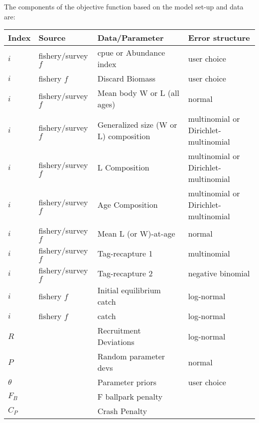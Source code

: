 The components of the objective function based on the model set-up and data are: 
\begin{longtable}{p{1cm} p{2.75cm} p{4.75cm} p{6.5cm}}
	\hline
	Index & Source & Data/Parameter & Error structure \Tstrut\Bstrut\\
	\hline	
	$i$ & fishery/survey $f$ & \gls{cpue} or Abundance index	 & user choice \Tstrut\\
	$i$ & fishery $f$		 & Discard Biomass			 & user choice \Tstrut\\
	$i$ & fishery/survey $f$ & Mean body W or L (all ages) & normal \Tstrut\\
	$i$ & fishery/survey $f$ & Generalized size (W or L) composition & multinomial or Dirichlet-multinomial \Tstrut\\
	$i$ & fishery/survey $f$ & L Composition	 		 & multinomial or Dirichlet-multinomial \Tstrut\\
	$i$ & fishery/survey $f$ & Age Composition			 & multinomial or Dirichlet-multinomial \Tstrut\\
	$i$ & fishery/survey $f$ & Mean L (or W)-at-age 	 & normal \Tstrut\\
	$i$ & fishery/survey $f$ & Tag-recapture 1			 & multinomial \Tstrut\\
	$i$ & fishery/survey $f$ & Tag-recapture 2			 & negative binomial \Tstrut\\
	$i$ & fishery $f$		 & Initial equilibrium catch & log-normal \Tstrut\\
	$i$ & fishery $f$		 & catch					 & log-normal \Tstrut\\
	$R$ & 					 & Recruitment Deviations	 & log-normal \Tstrut\\
	$P$ & 					 & Random parameter devs  	 & normal \Tstrut\\
	$\theta$ & 				 & Parameter priors			 & user choice \Tstrut\\
	$F_B$ & 				 & F ballpark penalty		 & \Tstrut\\
	$C_P$ &					 & Crash Penalty			 & \Tstrut\Bstrut\\
	\hline
\end{longtable}




\pagebreak